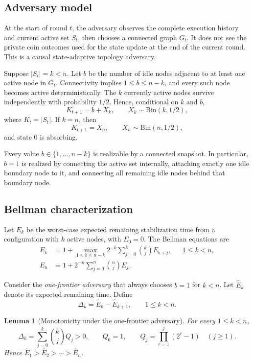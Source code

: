 \documentclass[11pt]{article}
\newtheorem{lemma}[theorem]{Lemma}
\begin{document}
\subsection{Adversary model}

At the start of round $t$, the adversary observes the complete execution history and current active set $S_t$, then chooses a connected graph $G_t$. It does not see the private coin outcomes used for the state update at the end of the current round. This is a causal state-adaptive topology adversary.

Suppose $|S_t|=k<n$. Let $b$ be the number of idle nodes adjacent to at least one active node in $G_t$. Connectivity implies $1\le b\le n-k$, and every such node becomes active deterministically. The $k$ currently active nodes survive independently with probability $1/2$. Hence, conditional on $k$ and $b$,
\[
  K_{t+1}=b+X_k,
  \qquad X_k\sim\mathrm{Bin}(k,1/2),
\]
where $K_t=|S_t|$. If $k=n$, then
\[
  K_{t+1}=X_n,
  \qquad X_n\sim\mathrm{Bin}(n,1/2),
\]
and state $0$ is absorbing.

Every value $b\in\{1,\ldots,n-k\}$ is realizable by a connected snapshot. In particular, $b=1$ is realized by connecting the active set internally, attaching exactly one idle boundary node to it, and connecting all remaining idle nodes behind that boundary node.

\subsection{Bellman characterization}

Let $E_k$ be the worst-case expected remaining stabilization time from a configuration with $k$ active nodes, with $E_0=0$. The Bellman equations are
\begin{align}
E_k
 &=1+\max_{1\le b\le n-k}
   2^{-k}\sum_{j=0}^{k}\binom{k}{j}E_{b+j},
   &&1\le k<n,\label{eq:bellman-k}\\
E_n
 &=1+2^{-n}\sum_{j=0}^{n}\binom{n}{j}E_j.\label{eq:bellman-n}
\end{align}

Consider the \emph{one-frontier adversary} that always chooses $b=1$ for $k<n$. Let $\widehat E_k$ denote its expected remaining time. Define
\[
  \Delta_k=\widehat E_k-\widehat E_{k+1},
  \qquad 1\le k<n.
\]

\begin{lemma}[Monotonicity under the one-frontier adversary]\label{lem:delta}
For every $1\le k<n$,
\[
  \Delta_k
   =\sum_{j=0}^{k}\binom{k}{j}Q_j>0,
  \qquad
  Q_0=1,
  \qquad
  Q_j=\prod_{r=1}^{j}(2^r-1)\quad(j\ge1).
\]
Hence $\widehat E_1>\widehat E_2>\cdots>\widehat E_n$.
\end{lemma}
\end{document}

